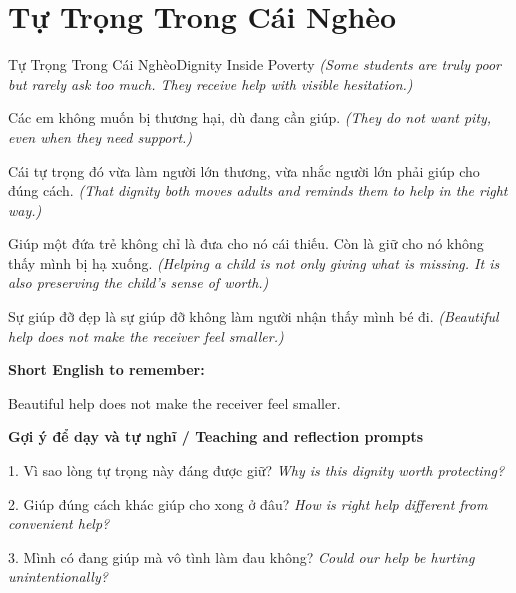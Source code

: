 \section{Tự Trọng Trong Cái Nghèo}
\begin{truyen}{Tự Trọng Trong Cái Nghèo}{Dignity Inside Poverty}
\textit{(Some students are truly poor but rarely ask too much. They receive help with visible hesitation.)}

Các em không muốn bị thương hại, dù đang cần giúp.
\textit{(They do not want pity, even when they need support.)}

Cái tự trọng đó vừa làm người lớn thương, vừa nhắc người lớn phải giúp cho đúng cách.
\textit{(That dignity both moves adults and reminds them to help in the right way.)}

Giúp một đứa trẻ không chỉ là đưa cho nó cái thiếu. Còn là giữ cho nó không thấy mình bị hạ xuống.
\textit{(Helping a child is not only giving what is missing. It is also preserving the child’s sense of worth.)}

\end{truyen}

\begin{baihoc}
Sự giúp đỡ đẹp là sự giúp đỡ không làm người nhận thấy mình bé đi.
\textit{(Beautiful help does not make the receiver feel smaller.)}
\end{baihoc}

\begin{ghinhoanh}
\textbf{Short English to remember:}

Beautiful help does not make the receiver feel smaller.

\end{ghinhoanh}

\begin{tuhocnhanh}
\textbf{Gợi ý để dạy và tự nghĩ / Teaching and reflection prompts}

1. Vì sao lòng tự trọng này đáng được giữ? \textit{Why is this dignity worth protecting?}

2. Giúp đúng cách khác giúp cho xong ở đâu? \textit{How is right help different from convenient help?}

3. Mình có đang giúp mà vô tình làm đau không? \textit{Could our help be hurting unintentionally?}
\end{tuhocnhanh}
\ngancach

